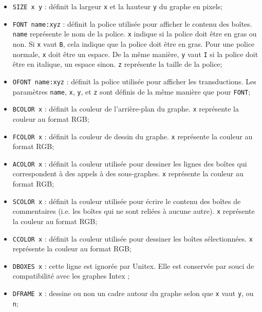 \begin{itemize}
  \item \verb+SIZE x y+ : définit la largeur  \verb+x+ et la hauteur \verb+y+ du graphe en pixels;
  
  \item \verb+FONT name:xyz+ : définit la police utilisée pour afficher le contenu des boîtes.
  	  \verb+name+ représente le nom de la police. \verb+x+ indique si la police doit être en
  	  gras ou non. Si \verb+x+ vaut \verb+B+, cela indique que la police doit être en gras. Pour
  	  une police normale, \verb+x+ doit être un espace. De la même manière, \verb+y+ vaut
  	  \verb+I+ si la police doit être en italique, un espace sinon. \verb+z+ représente la
  	  taille de la police;

  \item \verb+OFONT name:xyz+ : définit la police utilisée pour afficher les transductions. Les
  	  paramètres \verb+name+, \verb+x+, \verb+y+, et \verb+z+ sont définis de la même manière
  	  que pour \verb+FONT+;
  
  \item \verb+BCOLOR x+ : définit la couleur de l’arrière-plan du graphe. \verb+x+ représente la
  	  couleur au format RGB;
  \item \verb+FCOLOR x+ : définit la couleur de dessin du graphe. \verb+x+ représente la couleur au
  	  format RGB;

  \item \verb+ACOLOR x+ : définit la couleur utilisée pour dessiner les lignes des boîtes qui
  	  correspondent à des appels à des sous-graphes. \verb+x+ représente la couleur au format
  	  RGB;

  \item \verb+SCOLOR x+ : définit la couleur utilisée pour écrire le contenu des boîtes de
  	  commentaires (i.e. les boîtes qui ne sont reliées à aucune autre). \verb+x+ représente la
  	  couleur au format RGB;

  \item \verb+CCOLOR x+ : définit la couleur utilisée pour dessiner les boîtes sélectionnées. 
  \verb+x+ représente la couleur au format RGB;

  \item \verb+DBOXES x+ : cette ligne est ignorée par Unitex. Elle est conservée par souci de
  	  compatibilité avec les graphes Intex ;

  \item \verb+DFRAME x+ : dessine ou non un cadre autour du graphe selon que \verb+x+ vaut
  	  \verb+y+, ou \verb+n+;


\end{itemize}
